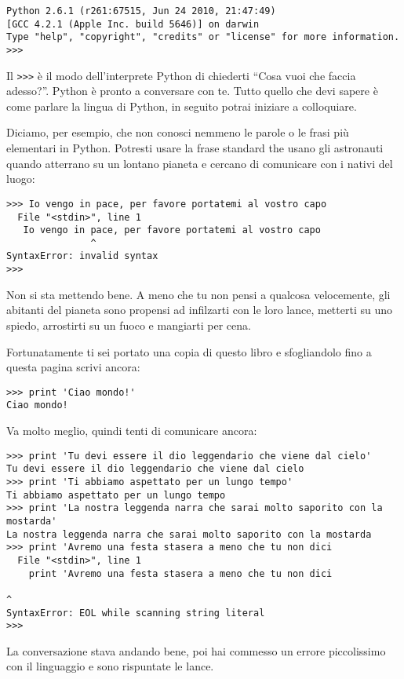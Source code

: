 
\beforeverb
\begin{verbatim}
Python 2.6.1 (r261:67515, Jun 24 2010, 21:47:49) 
[GCC 4.2.1 (Apple Inc. build 5646)] on darwin
Type "help", "copyright", "credits" or "license" for more information.
>>> 
\end{verbatim}
\afterverb
%
Il  {\tt >>>} \`{e} il modo dell'interprete Python di chiederti {``}Cosa vuoi che faccia adesso?''. Python \`{e} pronto a conversare con te. Tutto quello che devi sapere \`{e} come parlare la lingua di Python, in seguito potrai iniziare a colloquiare.

Diciamo, per esempio, che non conosci nemmeno le parole o le frasi pi\`{u} elementari in Python. Potresti usare la frase standard the usano gli astronauti quando atterrano su un lontano pianeta e cercano di comunicare con i nativi del luogo:

\beforeverb
\begin{verbatim}
>>> Io vengo in pace, per favore portatemi al vostro capo
  File "<stdin>", line 1
   Io vengo in pace, per favore portatemi al vostro capo
               ^
SyntaxError: invalid syntax
>>> 
\end{verbatim}
\afterverb
%
Non si sta mettendo bene. A meno che tu non pensi a qualcosa velocemente, gli abitanti del pianeta sono propensi ad infilzarti con le loro lance, metterti su uno spiedo, arrostirti su un fuoco e mangiarti per cena.


Fortunatamente ti sei portato una copia di questo libro e sfogliandolo fino a questa pagina scrivi ancora:

\beforeverb
\begin{verbatim}
>>> print 'Ciao mondo!'
Ciao mondo!
\end{verbatim}
\afterverb
%
Va molto meglio, quindi tenti di comunicare ancora:

\beforeverb
\begin{verbatim}
>>> print 'Tu devi essere il dio leggendario che viene dal cielo'
Tu devi essere il dio leggendario che viene dal cielo
>>> print 'Ti abbiamo aspettato per un lungo tempo'
Ti abbiamo aspettato per un lungo tempo
>>> print 'La nostra leggenda narra che sarai molto saporito con la mostarda'
La nostra leggenda narra che sarai molto saporito con la mostarda
>>> print 'Avremo una festa stasera a meno che tu non dici
  File "<stdin>", line 1
    print 'Avremo una festa stasera a meno che tu non dici
                                                                                         ^
SyntaxError: EOL while scanning string literal
>>> 
\end{verbatim}
\afterverb
%
La conversazione stava andando bene, poi hai commesso un errore piccolissimo con il linguaggio e sono rispuntate le lance.


